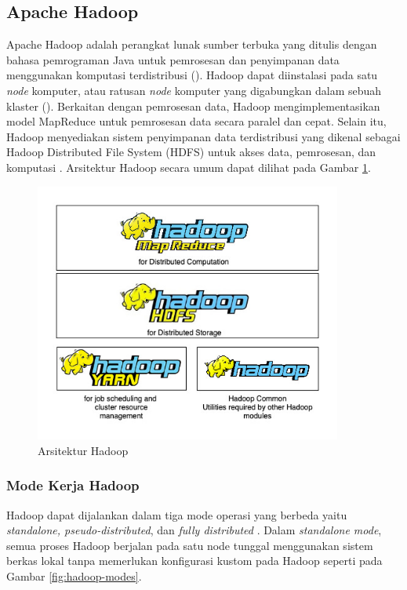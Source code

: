 \subsection{Apache Hadoop}
Apache Hadoop adalah perangkat lunak sumber terbuka yang ditulis dengan bahasa pemrograman Java untuk pemrosesan dan penyimpanan data menggunakan komputasi terdistribusi (\cite{ApacheHadoop}). Hadoop dapat diinstalasi pada satu \textit{node} komputer, atau ratusan \textit{node} komputer yang digabungkan dalam sebuah klaster (\cite{maneasEvolutionHadoopDistributed2018}). Berkaitan dengan pemrosesan data, Hadoop mengimplementasikan model MapReduce untuk pemrosesan data secara paralel dan cepat. Selain itu, Hadoop menyediakan sistem penyimpanan data terdistribusi yang dikenal sebagai Hadoop Distributed File System (HDFS) untuk akses data, pemrosesan, dan komputasi \cite{dabasAnalysisCommentsYoutube2019}. Arsitektur Hadoop secara umum dapat dilihat pada Gambar \ref{fig:hadoop-str}.

\begin{figure}[h!]
    \centering
    \includegraphics[width=0.9\textwidth]{figures/ch02/hadoop-str}
    \caption{Arsitektur Hadoop}
    \label{fig:hadoop-str}
\end{figure}

\subsubsection{Mode Kerja Hadoop}
Hadoop dapat dijalankan dalam tiga mode operasi yang berbeda yaitu \textit{standalone, pseudo-distributed}, dan \textit{fully distributed} \cite{johnDataLakeEnterprises2017}. Dalam \textit{standalone mode}, semua proses Hadoop berjalan pada satu node tunggal menggunakan sistem berkas lokal tanpa memerlukan konfigurasi kustom pada Hadoop seperti pada Gambar \ref{fig:hadoop-modes}. 

